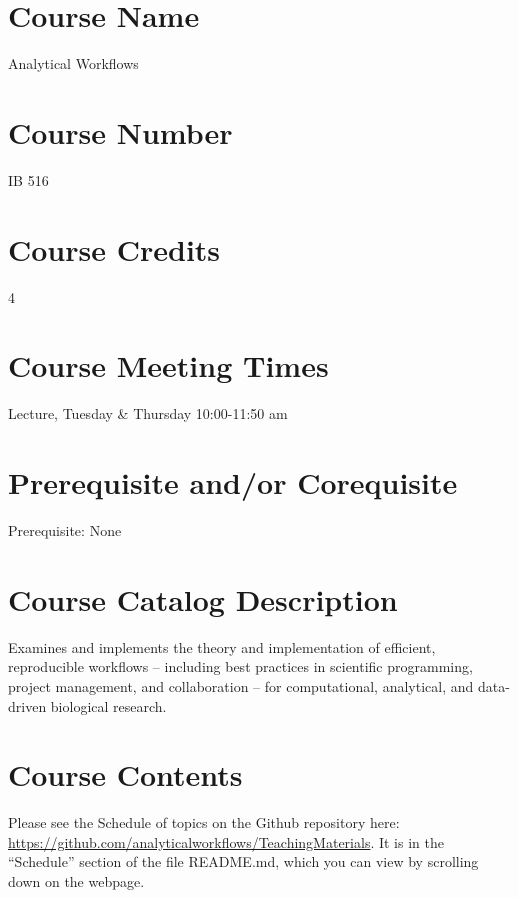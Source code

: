 \documentclass[10pt]{article}
\begin{document}



\section*{Course Name}
Analytical Workflows

\section*{Course Number}
 IB 516

\section*{Course Credits}
4

\section*{Course Meeting Times}
Lecture, Tuesday \& Thursday 10:00-11:50 am

\section*{Prerequisite and/or Corequisite}
Prerequisite: None

\section*{Course Catalog Description}
Examines and implements the theory and implementation of efficient, reproducible workflows -- 
including best practices in scientific programming, project management, and collaboration --  for 
computational, analytical, and data-driven biological research.

\section*{Course Contents}
Please see the Schedule of topics on the Github repository here: \url{https://github.com/analyticalworkflows/TeachingMaterials}. It is in the ``Schedule'' section of the file README.md, which you can view by scrolling down on the webpage.
\end{document}
